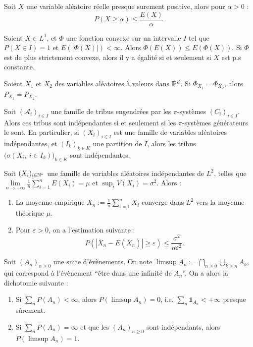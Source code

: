 \documentclass[11pt,a4paper]{article}
\begin{document}
\begin{thmstar}
 Soit $X$ une variable aléatoire réelle presque surement positive, alors pour $\alpha>0$ : \[P(X \geq \alpha) \leq \frac{E(X)}{\alpha}\]
\end{thmstar}

\begin{thmstar}
 Soient $X\in L^1$, et $\Phi$ une fonction convexe sur un intervalle $I$ tel que $P(X\in I)=1$ et $E(|\Phi(X)|)<\infty$. Alors $\Phi(E(X)) \leq E(\Phi(X))$. Si $\Phi$ est de plus strictement convexe, alors il y a égalité si et seulement si $X$ est p.s constante.
\end{thmstar}

\begin{thmstar}
Soient $X_1$ et $X_2$ des variables aléatoires à valeurs dans $\mathbb R^d$. Si $\Phi_{X_1}=\Phi_{X_2}$, alors $P_{X_1}=P_{X_2}$.
\end{thmstar}

\begin{thmstar}
[Coalitions] Soit $(\mathcal{A}_i)_{i\in I}$ une famille de tribus engendrées par les $\pi$-systèmes $(C_i)_{i\in I}$. Alors ces tribus sont indépendantes si et seulement si les $\pi$-systèmes générateurs le sont. En particulier, si $(X_i)_{i\in I}$ est une famille de variables aléatoires indépendantes, et $(I_k)_{k\in K}$ une partition de $I$, alors les tribus $\big(\sigma\left(X_i,\ i\in I_k\right)\big)_{k\in K}$ sont indépendantes.
\end{thmstar}

\begin{thmstar}
 Soit $(X_i)_{i\in \mathbb N^*}$ une famille de variables aléatoires indépendantes de $L^2$, telles que $\lim\limits_{n\to +\infty} \frac{1}{n}\sum_{i=1}^n E(X_i) = \mu$ et $\sup_i V(X_i) = \sigma^2$. Alors : 
\begin{enumerate}
\item La moyenne empirique $\displaystyle \overline{X}_n := \frac{1}{n}\sum_{i=1}^n X_i$ converge dans $L^2$ vers la moyenne théorique $\mu$.
\item Pour $\varepsilon >0$, on a l'estimation suivante : \[P(|\overline{X}_n - E(\overline{X}_n)| \geq \varepsilon) \leq \frac{\sigma^2}{n\varepsilon^2}.\]
\end{enumerate}
\end{thmstar}

\begin{lemmastar}
 Soit $(A_n)_{n\geq 0}$ une suite d'évènements. On note $\limsup A_n := \displaystyle \bigcap_{n\geq 0} \bigcup_{k\geq n} A_k$, qui correspond à l'évènement ``être dans une infinité de $A_n$''. On a alors la dichotomie suivante :
\begin{enumerate}
\item Si $\displaystyle \sum_n P(A_n) < \infty$, alors $P(\limsup A_n)=0$, i.e. $\sum_n \mathds{1}_{A_n} < +\infty$ presque sûrement.
\item Si $\displaystyle \sum_n P(A_n) = \infty$ et que les $(A_n)_{n\geq 0}$ sont indépendants, alors $P(\limsup A_n)=1$.
\end{enumerate}
\end{lemmastar}
\end{document}
